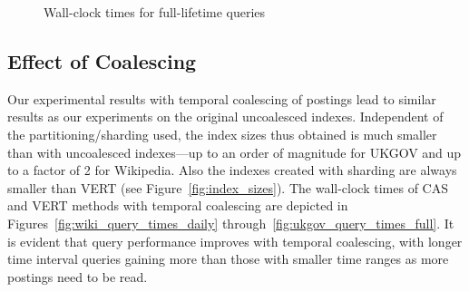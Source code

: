 \begin{figure}[tb]
  	\centering
   	\caption{Wall-clock times for full-lifetime queries}
\label{fig:sharding_qp_cas_vert_full}
\end{figure}

\subsection{Effect of Coalescing}

Our experimental results with temporal coalescing of postings
lead to similar results as our experiments on the original
uncoalesced indexes. Independent of the partitioning/sharding used,
the index sizes thus obtained is much smaller than with uncoalesced indexes---up to an
order of magnitude for UKGOV and up to a factor of 2 for
Wikipedia. Also the indexes created with sharding are always smaller than
VERT (see Figure~\ref{fig:index_sizes}). The wall-clock times of CAS and VERT methods with temporal coalescing are depicted in
Figures~\ref{fig:wiki_query_times_daily} through~\ref{fig:ukgov_query_times_full}. It is evident that query
performance improves with temporal coalescing, with longer time interval
queries gaining more than those with smaller time ranges as more
postings need to be read. 


